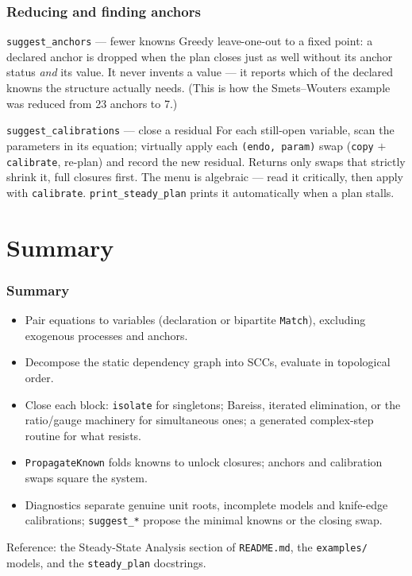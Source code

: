 \documentclass[10pt,slidestop]{beamer}
\newcommand{\code}[1]{\texttt{#1}}
\begin{document}
\begin{frame}\frametitle{Reducing and finding anchors}
  \begin{block}{\texttt{suggest\_anchors} --- fewer knowns}
    Greedy leave-one-out to a fixed point: a declared anchor is dropped when the
    plan closes just as well without its anchor status \emph{and} its value. It
    never invents a value --- it reports which of the declared knowns the
    structure actually needs. (This is how the Smets--Wouters example was reduced
    from 23 anchors to 7.)
  \end{block}

  \begin{block}{\texttt{suggest\_calibrations} --- close a residual}
    For each still-open variable, scan the parameters in its equation; virtually
    apply each \code{(endo, param)} swap (\code{copy} $+$ \code{calibrate},
    re-plan) and record the new residual. Returns only swaps that strictly
    shrink it, full closures first. The menu is algebraic --- read it critically,
    then apply with \code{calibrate}. \code{print\_steady\_plan} prints it
    automatically when a plan stalls.
  \end{block}
\end{frame}

\section{Summary}

\begin{frame}\frametitle{Summary}
  \begin{itemize}
  \item Pair equations to variables (declaration or bipartite \code{Match}),
    excluding exogenous processes and anchors.\newline
  \item Decompose the static dependency graph into SCCs, evaluate in topological
    order.\newline
  \item Close each block: \code{isolate} for singletons; Bareiss, iterated
    elimination, or the ratio/gauge machinery for simultaneous ones; a generated
    complex-step routine for what resists.\newline
  \item \code{PropagateKnown} folds knowns to unlock closures; anchors and
    calibration swaps square the system.\newline
  \item Diagnostics separate genuine unit roots, incomplete models and
    knife-edge calibrations; \code{suggest\_*} propose the minimal knowns or the
    closing swap.
  \end{itemize}

  \vfill
  \centering\small Reference: the Steady-State Analysis section of
  \texttt{README.md}, the \texttt{examples/} models, and the \texttt{steady\_plan}
  docstrings.
\end{frame}
\end{document}
